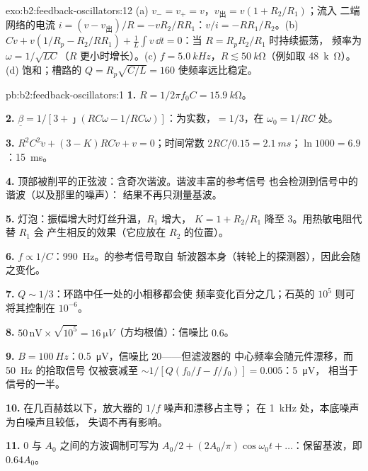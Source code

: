 \begin{solution}{exo:b2:feedback-oscillators:12}
(a) $v_- = v_+ = v$，$v_{\text{出}} = v(1 + R_2/R_1)$；流入
二端网络的电流 $i = (v - v_{\text{出}})/R = -vR_2/RR_1$：$v/i = -RR_1/R_2$。(b) $C\dot v +
v(1/R_p - R_2/RR_1) + \frac1L\int v\,\dd t = 0$：当 $R = R_pR_2/R_1$ 时持续振荡，
频率为 $\omega = 1/\sqrt{LC}$（$R$ 更小时增长）。(c) $f = \qty{5.0}{kHz}$，$R \lesssim
\qty{50}{k\ohm}$（例如取 \qty{48}{k\ohm}）。(d) 饱和；槽路的 $Q = R_p
\sqrt{C/L} = 160$ 使频率远比稳定。
\end{solution}

\begin{solution}{pb:b2:feedback-oscillators:1}
\textbf{1.} $R = 1/2\pi f_0C = \qty{15.9}{k\ohm}$。

\textbf{2.} $\underline\beta = 1/[3 + \jmath(RC\omega - 1/RC\omega)]$：为实数，$= 1/3$，在
$\omega_0 = 1/RC$ 处。

\textbf{3.} $R^2C^2\ddot v + (3 - K)RC\dot v + v = 0$；时间常数 $2RC/0.15 =
\qty{2.1}{ms}$；$\ln1000 = 6.9$：\qty{15}{ms}。

\textbf{4.} 顶部被削平的正弦波：含奇次谐波。谐波丰富的参考信号
也会检测到信号中的谐波（以及那里的噪声）：
结果不再只测量基波。

\textbf{5.} 灯泡：振幅增大时灯丝升温，$R_1$ 增大，
$K = 1 + R_2/R_1$ 降至 $3$。用热敏电阻代替 $R_1$ 会
产生相反的效果（它应放在 $R_2$ 的位置）。

\textbf{6.} $f \propto 1/C$：\qty{990}{Hz}。的参考信号取自
斩波器本身（转轮上的探测器），因此会随之变化。

\textbf{7.} $Q \sim 1/3$：环路中任一处的小相移都会使
频率变化百分之几；石英的 $10^5$ 则可将其控制在 $10^{-6}$。

\textbf{8.} $50\,\text{nV} \times \sqrt{10^5} = \qty{16}{\micro V}$（方均根值）：信噪比 $0.6$。

\textbf{9.} $B = \qty{100}{Hz}$：\qty{0.5}{\micro V}，信噪比 $20$——但滤波器的
中心频率会随元件漂移，而 \qty{50}{Hz} 的拾取信号
仅被衰减至 $\sim 1/[Q(f_0/f - f/f_0)] = 0.005$：\qty{5}{\micro V}，
相当于信号的一半。

\textbf{10.} 在几百赫兹以下，放大器的 $1/f$ 噪声和漂移占主导；
在 \qty{1}{kHz} 处，本底噪声为白噪声且较低，
失调不再有影响。

\textbf{11.} $0$ 与 $A_0$ 之间的方波调制可写为 $A_0/2 + (2A_0/\pi)
\cos\omega_0t + \dots$：保留基波，即 $0.64A_0$。


\end{solution}
